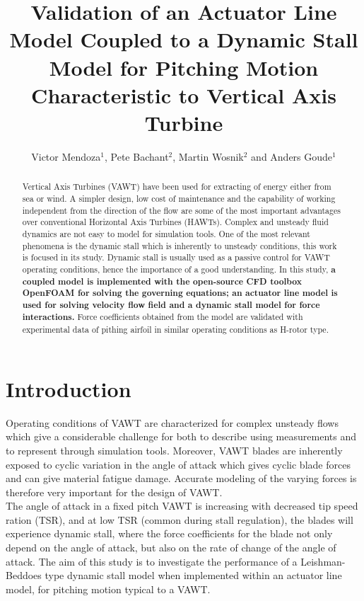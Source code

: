 \documentclass[a4paper]{jpconf}
\begin{document}
\title{Validation of an Actuator Line Model Coupled to a Dynamic Stall Model for Pitching Motion Characteristic to Vertical Axis Turbine} %
\author{Victor Mendoza$^{1}$, Pete Bachant$^{2}$, Martin Wosnik$^{2}$ and Anders Goude$^{1}$ }
\address{$^{1}$ Department of Engineering Sciences, Division of Electricity, Uppsala University, \\Uppsala 751 21, Sweden}
\address{$^{2}$ Center for Ocean Renewable Energy, University of New Hampshire, 24 Colovos Rd.,\\ Durham, NH 03824, USA}




\begin{abstract}
Vertical Axis Turbines (VAWT) have been used for extracting of energy either from sea or wind. A simpler design, low cost of maintenance and the capability of working independent from the direction of the flow are some of the most important advantages over conventional Horizontal Axis Turbines (HAWTs). Complex and unsteady fluid dynamics are not easy to model for simulation tools. One of the most relevant phenomena is the dynamic stall which is inherently to unsteady conditions, this work is focused in its study. 
Dynamic stall is usually used as a passive control for VAWT operating conditions, hence the importance of a good understanding. In this study, \textbf{a coupled model is implemented with the open-source CFD toolbox OpenFOAM for solving the governing equations; an actuator line model is used for solving velocity flow field and a dynamic stall model for force interactions.} Force coefficients obtained from the model are validated with experimental data of pithing airfoil in similar operating conditions as H-rotor type.   
\end{abstract}



\section{Introduction}
Operating conditions of VAWT are characterized for complex unsteady flows which give a considerable challenge for both to describe using measurements and to represent through simulation tools\cite{huyer1996unsteady}. Moreover, VAWT blades are inherently exposed to cyclic variation in the angle of attack which gives cyclic blade forces and can give material fatigue damage. Accurate modeling of the varying forces is therefore very important for the design of VAWT.\\
The angle of attack in a fixed pitch VAWT is increasing with decreased tip speed ration (TSR), and at low TSR (common during stall regulation), the blades will experience dynamic stall, where the force coefficients for the blade not only depend on the angle of attack, but also on the rate of change of the angle of attack. The aim of this study is to investigate the performance of a Leishman-Beddoes type dynamic stall model when implemented within an actuator line model, for pitching motion typical to a VAWT.
\end{document}
